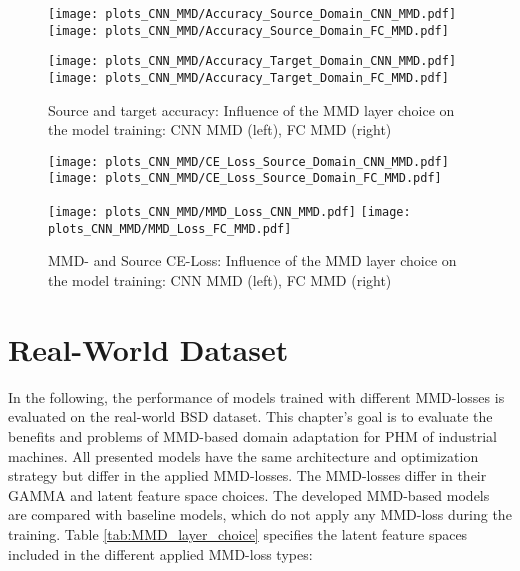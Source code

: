 \begin{figure}[htp]
  \centering
  \texttt{[image: plots\_CNN\_MMD/Accuracy\_Source\_Domain\_CNN\_MMD.pdf]}
  \hspace{.3cm}
  \texttt{[image: plots\_CNN\_MMD/Accuracy\_Source\_Domain\_FC\_MMD.pdf]}

  \vspace{.1cm}

  \texttt{[image: plots\_CNN\_MMD/Accuracy\_Target\_Domain\_CNN\_MMD.pdf]}
  \hspace{.3cm}
  \texttt{[image: plots\_CNN\_MMD/Accuracy\_Target\_Domain\_FC\_MMD.pdf]}

  \caption{Source and target accuracy: Influence of the MMD layer choice on the model training: CNN MMD (left), FC MMD (right)}
  \label{fig:accuracy_cnn_and_no_cnn_mmd}
\end{figure}

\begin{figure}[H]
  \centering
  \texttt{[image: plots\_CNN\_MMD/CE\_Loss\_Source\_Domain\_CNN\_MMD.pdf]}
  \hspace{.3cm}
  \texttt{[image: plots\_CNN\_MMD/CE\_Loss\_Source\_Domain\_FC\_MMD.pdf]}

  \vspace{.1cm}

  \texttt{[image: plots\_CNN\_MMD/MMD\_Loss\_CNN\_MMD.pdf]}
  \hspace{.1cm}
  \texttt{[image: plots\_CNN\_MMD/MMD\_Loss\_FC\_MMD.pdf]}

  \caption{MMD- and Source CE-Loss: Influence of the MMD layer choice on the model training: CNN MMD (left), FC MMD (right)}
  \label{fig:loss_cnn_and_no_cnn_mmd}
\end{figure}

\section{Real-World Dataset}\label{sec:results_real_world_dataset}
In the following, the performance of models trained with different MMD-losses is evaluated on the real-world BSD dataset. This chapter's goal is to evaluate the benefits and problems of MMD-based domain adaptation for PHM of industrial machines. All presented models have the same architecture and optimization strategy but differ in the applied MMD-losses. The MMD-losses differ in their GAMMA and latent feature space choices. The developed MMD-based models are compared with baseline models, which do not apply any MMD-loss during the training. Table \ref{tab:MMD_layer_choice}  specifies the latent feature spaces included in the different applied MMD-loss types:

